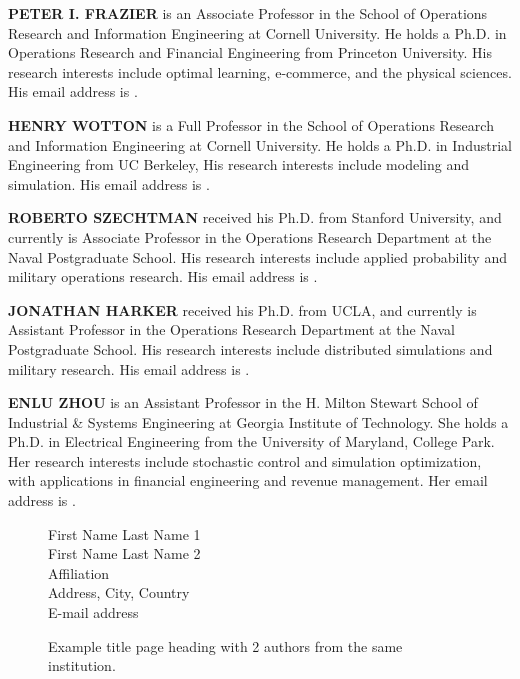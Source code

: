 \documentclass{scspaperproc}
\theoremstyle{scsthe}
\begin{document}
\textbf{\uppercase{PETER I. FRAZIER}} is an Associate Professor in the School of Operations Research and Information Engineering at Cornell University. He holds a Ph.D. in Operations Research and Financial Engineering from Princeton University. His research interests include optimal learning, e-commerce, and the physical sciences.  His email address is .

\textbf{\uppercase{HENRY WOTTON}} is a Full Professor in the School of Operations Research and Information Engineering at Cornell University. He holds a Ph.D. in Industrial Engineering from UC Berkeley, His research interests include modeling and simulation. His email address is .

\textbf{\uppercase{ROBERTO SZECHTMAN}} received his Ph.D. from Stanford University, and currently is Associate Professor in the Operations Research Department at the Naval Postgraduate School. His research interests include applied probability and military operations research. His email address is .

\textbf{\uppercase{JONATHAN HARKER}} received his Ph.D. from UCLA, and currently is Assistant Professor in the Operations Research Department at the Naval Postgraduate School. His research interests include distributed simulations and military research. His email address is .

\textbf{\uppercase{ENLU ZHOU}} is an Assistant Professor in the H. Milton Stewart School of Industrial \& Systems Engineering at Georgia Institute of Technology. She holds a Ph.D. in Electrical Engineering from the University of Maryland, College Park. Her research interests include stochastic control and simulation optimization, with applications in financial engineering and revenue management. Her email address is .

\newpage

\begin{figure}[htb]
{
\centering
First Name Last Name 1 \\
First Name Last Name 2 \\
\vspace{12pt}
Affiliation \\
Address, City, Country \\
E-mail address
\caption{Example title page heading with 2 authors from the same institution.\label{fig2same}}
}
\end{figure}
\end{document}
